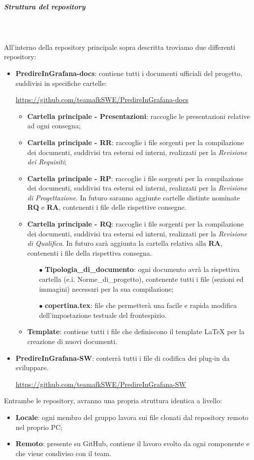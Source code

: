 \subparagraph{Struttura del repository} \mbox{} \\ \mbox{} \\
All'interno della repository principale sopra descritta troviamo due differenti repository: \begin{itemize}
\item \textbf{PredireInGrafana-docs}: contiene tutti i documenti ufficiali del progetto, suddivisi in specifiche cartelle: \\
\centerline{\url{https://github.com/teamafkSWE/PredireInGrafana-docs}}  \begin{itemize}
\item \textbf{Cartella principale - Presentazioni}: raccoglie le presentazioni relative ad ogni consegna;
\item \textbf{Cartella principale - RR}: raccoglie i file sorgenti per la compilazione dei documenti, suddivisi tra esterni ed interni, realizzati per la \textit{Revisione dei Requisiti};
\item \textbf{Cartella principale - RP}: raccoglie i file sorgenti per la compilazione dei documenti, suddivisi tra esterni ed interni, realizzati per la \textit{Revisione di Progettazione}. In futuro saranno aggiunte cartelle distinte nominate \textbf{RQ} e \textbf{RA}, contenenti i file delle rispettive consegne.
\item \textbf{Cartella principale - RQ}: raccoglie i file sorgenti per la compilazione dei documenti, suddivisi tra esterni ed interni, realizzati per la \textit{Revisione di Qualifica}. In futuro sarà aggiunta la cartella relativa alla \textbf{RA}, contenenti i file della rispettiva consegna.
\begin{itemize}
\item[$\bullet$] \textbf{Tipologia\_di\_documento}: ogni documento avrà la rispettiva cartella (e.i. Norme\_di\_progetto), contenente tutti i file (sezioni ed immagini) necessari per la sua compilazione;
\item[$\bullet$] \textbf{copertina.tex}: file che permetterà una facile e rapida modifica dell'impostazione testuale del frontespizio.
\end{itemize}
\item \textbf{Template}: contiene tutti i file che definiscono il template \LaTeX{} per la creazione di nuovi documenti.
\end{itemize} 
\item \textbf{PredireInGrafana-SW}: conterrà tutti i file di codifica dei plug-in da sviluppare. \\ \centerline{\url{https://github.com/teamafkSWE/PredireInGrafana-SW}}
\end{itemize}
Entrambe le repository, avranno una propria struttura identica a livello: \begin{itemize}
\item \textbf{Locale}: ogni membro del gruppo lavora sui file clonati dal repository remoto nel proprio PC;
\item \textbf{Remoto}: presente su GitHub, contiene il lavoro svolto da ogni componente e che viene condiviso con il team.
\end{itemize}

